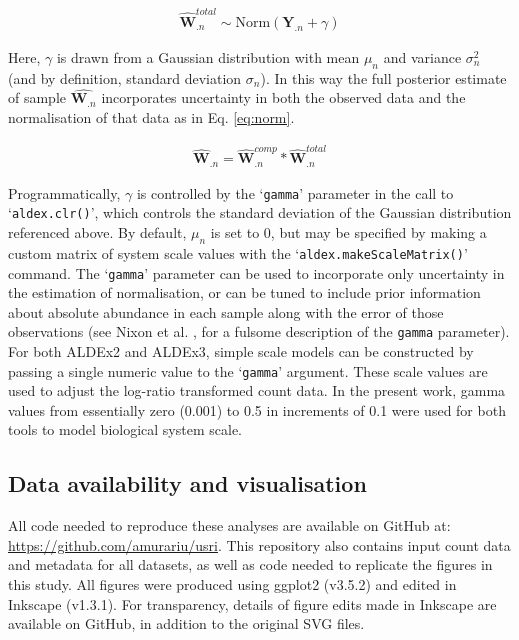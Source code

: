 \documentclass[10pt,letterpaper]{article}
\begin{document}
\begin{eqnarray}
	\label{eq:adaptation}
	\hat{\mathbf{W}}^{total}_{.n} \sim \mathrm{Norm}(\mathbf{Y}_{.n} + \gamma)
\end{eqnarray}

Here, $\gamma$ is drawn from a Gaussian distribution with mean $\mu_n$ and variance $\sigma^2_n$ (and by definition, standard deviation $\sigma_n$). In this way the full posterior estimate of sample $\hat{\mathbf{W}_{.n}}$ incorporates uncertainty in both the observed data and the normalisation of that data as in Eq. \ref{eq:norm}.

\begin{eqnarray}
	\label{eq:norm}
	\hat{\mathbf{W}}_{.n} = \hat{\mathbf{W}}^{comp}_{.n} * \hat{\mathbf{W}}^{total}_{.n}
\end{eqnarray}


Programmatically, $\gamma$ is controlled by the `\texttt{gamma}' parameter in the call to `\texttt{aldex.clr()}', which controls the standard deviation of the Gaussian distribution referenced above. By default, $\mu_n$ is set to 0, but may be specified by making a custom matrix of system scale values with the `\texttt{aldex.makeScaleMatrix()}' command. The `\texttt{gamma}' parameter can be used to incorporate only uncertainty in the estimation of normalisation, or can be tuned to include prior information about absolute abundance in each sample along with the error of those observations (see Nixon et al. \cite{nixon_incorporating_2025}, for a fulsome description of the \texttt{gamma} parameter). For both ALDEx2 and ALDEx3, simple scale models can be constructed by passing a single numeric value to the `\texttt{gamma}' argument. These scale values are used to adjust the log-ratio transformed count data. In the present work, gamma values from essentially zero (0.001) to 0.5 in increments of 0.1 were used for both tools to model biological system scale.

\subsection*{Data availability and visualisation}
All code needed to reproduce these analyses are available on GitHub at: \url{https://github.com/amurariu/usri}. This repository also contains input count data and metadata for all datasets, as well as code needed to replicate the figures in this study. All figures were produced using ggplot2 (v3.5.2) \cite{wickham_ggplot_2016} and edited in Inkscape (v1.3.1). For transparency, details of figure edits made in Inkscape are available on GitHub, in addition to the original SVG files.
\end{document}
